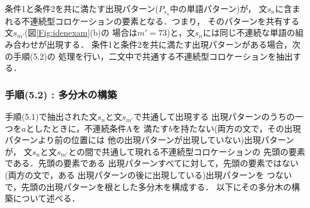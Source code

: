 条件1と条件2を共に満たす出現パターン($P_{s_n}$中の単語パターン)が，
文$s_n$に含まれる不連続型コロケーションの要素となる．つまり，
そのパターンを共有する文$s_{m'}$(図\ref{Fig:idenexam}(b)の
場合は\(m'=73\))と，文$s_n$には同じ不連続な単語の組み合わせが出現する．
条件1と条件2を共に満たす出現パターンがある場合，次の手順(5.2)の
処理を行い，二文中で共通する不連続型コロケーションを抽出する．

\subsubsection*{手順(5.2) : 多分木の構築}

手順(5.1)で抽出された文$s_n$と文$s_{m'}$で共通して出現する
出現パターンのうちの一つを$a$としたときに，不連続条件Aを
満たす$b$を持たない(両方の文で，その出現パターンより前の位置には
他の出現パターンが出現していない)出現パターンが，
文$s_n$と文$s_{m'}$との間で共通して現れる不連続型コロケーションの
先頭の要素である．先頭の要素である
出現パターンすべてに対して，先頭の要素ではない(両方の文で，ある
出現パターンの後に出現している)出現パターンを
つないで，先頭の出現パターンを根とした多分木を構成する．
以下にその多分木の構築について述べる．

